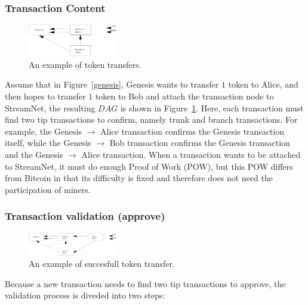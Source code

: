 \subsubsection{Transaction Content}

\begin{figure}[!ht]
\begin{center}
\includegraphics[width=0.35\textwidth]{figures/simple_transfer.eps}
    \caption{
        An example of token transfers.
     }
\label{simple_transfer}
\end{center}
\end{figure}

Assume that in Figure~\ref{genesis}, Genesis wants to transfer $1$ token to Alice, 
and then hopes to transfer $1$ token to Bob and attach the transaction node to StreamNet, the resulting $DAG$ is shown in Figure~\ref{simple_transfer}.
Here, each transaction must find two tip transactions to confirm, namely trunk and branch transactions.
For example, the Genesis $\rightarrow$ Alice transaction confirms the Genesis transaction itself,
while the Genesis $\rightarrow$ Bob transaction confirms the Genesis transaction and the Genesis $\rightarrow$ Alice transaction.
When a transaction wants to be attached to StreamNet, it must do enough Proof of Work (POW),
but this POW differs from Bitcoin in that its difficulty is fixed and therefore does not need the participation of miners.

\subsubsection{Transaction validation (approve)}

\begin{figure}[!ht]
\begin{center}
\includegraphics[width=0.35\textwidth]{figures/txn_success.eps}
    \caption{
        An example of succesfull token transfer.
     }
\label{txn_success}
\end{center}
\end{figure}

Because a new transaction needs to find two tip transactions to approve, the validation process is diveded into two steps:

